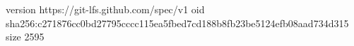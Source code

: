 version https://git-lfs.github.com/spec/v1
oid sha256:c271876cc0bd27795cccc115ea5fbed7cd188b8fb23be5124efb08aad734d315
size 2595
